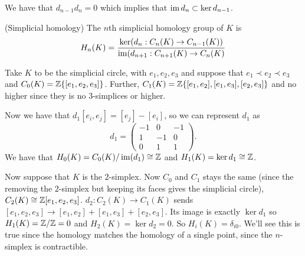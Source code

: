 \documentclass{article}
\begin{document}
We have that $ d_{n-1}d_n = 0 $ which implies that $ \operatorname{im} d_n \subset \ker d_{n-1} $.
\begin{definition}
	(Simplicial homology) The $ n $th simplicial homology group of $ K $ is
	\[
	H_n(K) = \frac{\ker(d_n: C_n(K) \to C_{n-1}(K))}{\operatorname{im}(d_{n+1}: C_{n+1}(K) \to C_n(K)}
	\]
\end{definition}
\begin{example}
	Take $ K $ to be the simplicial circle, with $ e_1,e_2,e_3 $ and suppose that $ e_1\prec e_2 \prec e_3 $ and $ C_0(K) = \mathbb{Z}\{[e_1,e_2,e_3]\} $. Further, $ C_1(K) = \mathbb{Z}\{[e_1,e_2], [e_1,e_3], [e_2,e_3]\}$ and no higher since they is no $ 3 $-simplices or higher. \par
	Now we have that $ d_1[e_i,e_j] = [e_j] - [e_i] $, so we can represent $ d_1 $ as
	\[
	  d_1 = \begin{pmatrix}
		  -1 & 0 & -1 \\
		  1 & -1 & 0 \\
		  0 & 1 & 1
	  \end{pmatrix}.
	\]
	We have that $ H_0(K) = C_0(K)/\operatorname{im}(d_1) \cong \mathbb{Z} $ and $ H_1(K) = \ker d_1 \cong\mathbb{Z} $.
\end{example}
\begin{example}
	Now suppose that $ K $ is the $ 2 $-simplex. Now $ C_0 $ and $ C_1 $ stays the same (since the removing the $ 2 $-simplex but keeping its faces gives the simplicial circle), $ C_2(K) \cong \mathbb{Z}[ e_1,e_2,e_3] $. $ d_2:C_2(K) \to C_1(K) $ sends $ [e_1,e_2,e_3] \to [e_1,e_2] + [e_1,e_3] + [e_2,e_3] $. Its image is exactly $ \ker d_1 $ so $ H_1(K) = \mathbb{Z}/\mathbb{Z} = 0 $ and $ H_2(K) = \ker d_2 = 0 $. So $ H_i(K) = \delta_{i0} $. We'll see this is true since the homology matches the homology of a single point, since the $ n $-simplex is contractible.
\end{example}
\end{document}
